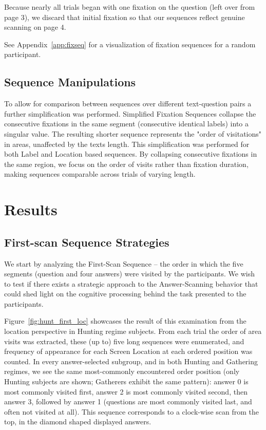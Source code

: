 \documentclass[manuscript,review,anonymous]{acmart}
\begin{document}
    Because nearly all trials began with one fixation on the question (left over from page 3), we discard that initial fixation so that our sequences reflect genuine scanning on page 4.

    See Appendix~\ref{app:fixseq} for a visualization of fixation sequences for a random participant. 

    
    \subsection{Sequence Manipulations}

    To allow for comparison between sequences over different text-question pairs a further simplification was performed. Simplified Fixation Sequences collapse the consecutive fixations in the same segment (consecutive identical labels) into a singular value. The resulting shorter sequence represents the "order of visitations" in areas, unaffected by the texts length. This simplification was performed for both Label and Location based sequences. By collapsing consecutive fixations in the same region, we focus on the order of visits rather than fixation duration, making sequences comparable across trials of varying length.

\section{Results}
    \subsection{First-scan Sequence Strategies}
    We start by analyzing the First-Scan Sequence -- the order in which the five segments (question and four answers) were visited by the participants. We wish to test if there exists a strategic approach to the Answer-Scanning behavior that could shed light on the cognitive processing behind the task presented to the participants. 

    Figure~\ref{fig:hunt_first_loc} showcases the result of this examination from the location perspective in Hunting regime subjects. From each trial the order of area visits was extracted, these (up to) five long sequences were enumerated, and frequency of appearance for each Screen Location at each ordered position was counted. In every answer-selected subgroup, and in both Hunting and Gathering regimes, we see the same most-commonly encountered order position (only Hunting subjects are shown; Gatherers exhibit the same pattern): answer 0 is most commonly visited first, answer 2 is most commonly visited second, then answer 3, followed by answer 1 (questions are most commonly visited last, and often not visited at all). This sequence corresponds to a clock-wise scan from the top, in the diamond shaped displayed answers.
\end{document}
